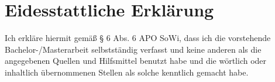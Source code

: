 \documentclass[
  fontsize=12pt,     %
  a4paper,
  twoside=false,     %
  numbers=noenddot,
  parskip=never,     %
  chapterprefix=false,
]{scrreprt}
\begin{document}
\makedeckblatt

\thispagestyle{empty}
\null
\newpage


% 



\tableofcontents

\listoffigures
\listoftables

\cleardoublepage
{}










\appendix





	
\clearpage
\printbibliography[heading=bibintoc,title={Literaturverzeichnis}]

\clearpage
\thispagestyle{empty}

\section*{Eidesstattliche Erklärung}

Ich erkläre hiermit gemäß § 6 Abs. 6 APO SoWi, dass ich die vorstehende Bachelor-/Masterarbeit selbstständig verfasst und keine anderen als die angegebenen Quellen und Hilfsmittel benutzt habe und die wörtlich oder inhaltlich übernommenen Stellen als solche kenntlich gemacht habe.
\end{document}
